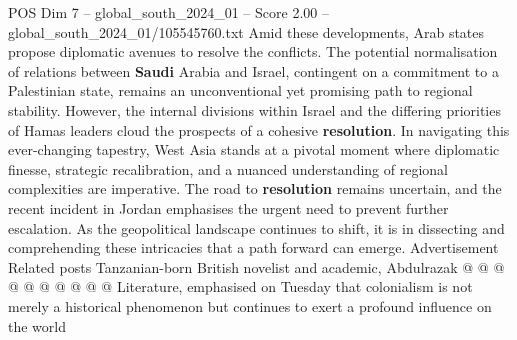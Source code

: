 \begin{textsample}{POS Dim 7 – global\_south\_2024\_01 – Score 2.00 – global\_south\_2024\_01/105545760.txt}
Amid these developments, Arab states propose diplomatic avenues to resolve the conflicts.
The potential normalisation of relations between \textbf{Saudi} Arabia and Israel, contingent on a commitment to a Palestinian state, remains an unconventional yet promising path to regional stability.
However, the internal divisions within Israel and the differing priorities of Hamas leaders cloud the prospects of a cohesive \textbf{resolution}.
In navigating this ever-changing tapestry, West Asia stands at a pivotal moment where diplomatic finesse, strategic recalibration, and a nuanced understanding of regional complexities are imperative.
The road to \textbf{resolution} remains uncertain, and the recent incident in Jordan emphasises the urgent need to prevent further escalation.
As the geopolitical landscape continues to shift, it is in dissecting and comprehending these intricacies that a path forward can emerge.
Advertisement Related posts Tanzanian-born British novelist and academic, Abdulrazak @ @ @ @ @ @ @ @ @ @ Literature, emphasised on Tuesday that colonialism is not merely a historical phenomenon but continues to exert a profound influence on the world

\end{textsample}
